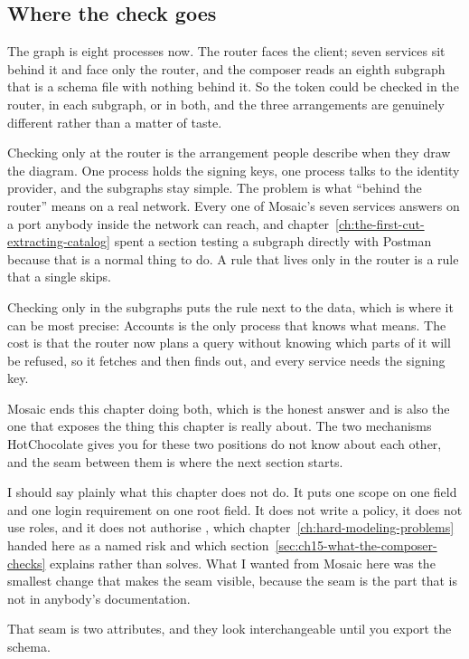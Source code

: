 \subsection*{Where the check goes}

%
The graph is eight processes now. The router faces the client; seven services
sit behind it and face only the router, and the composer reads an eighth
subgraph that is a schema file with nothing behind it. So the token could be checked in the
router, in each subgraph, or in both, and the three arrangements are genuinely
different rather than a matter of taste.

Checking only at the router is the arrangement people describe when they draw
the diagram. One process holds the signing keys, one process talks to the
identity provider, and the subgraphs stay simple. The problem is what
\enquote{behind the router} means on a real network. Every one of Mosaic's
seven services answers on a port anybody inside the network can reach, and
chapter~\ref{ch:the-first-cut-extracting-catalog} spent a section testing a
subgraph directly with Postman because that is a normal thing to do. A rule
that lives only in the router is a rule that a single  skips.

Checking only in the subgraphs puts the rule next to the data, which is where
it can be most precise: Accounts is the only process that knows what
 means. The cost is that the router now plans a query
without knowing which parts of it will be refused, so it fetches and then finds
out, and every service needs the signing key.

Mosaic ends this chapter doing both, which is the honest answer and is also the
one that exposes the thing this chapter is really about. The two mechanisms
HotChocolate gives you for these two positions do not know about each other,
and the seam between them is where the next section starts.

I should say plainly what this chapter does not do. It puts one scope on one
field and one login requirement on one root field. It does not write a policy,
it does not use roles, and it does not authorise , which
chapter~\ref{ch:hard-modeling-problems} handed here as a named risk and which
section~\ref{sec:ch15-what-the-composer-checks} explains rather than solves.
What I wanted from Mosaic here was the smallest change that makes the seam
visible, because the seam is the part that is not in anybody's documentation.

\medskip

That seam is two attributes, and they look interchangeable until you export the
schema.

%
